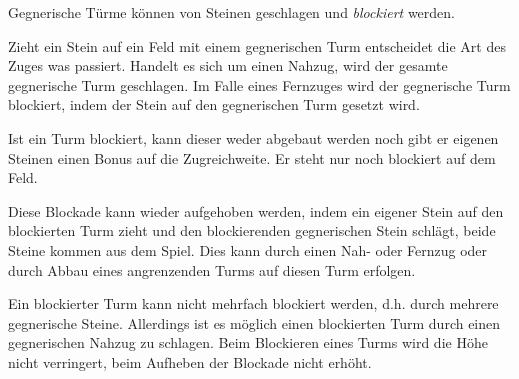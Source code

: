 

\newpage 
Gegnerische Türme können von Steinen geschlagen und \emph{blockiert} werden. 

Zieht ein Stein auf ein Feld mit einem gegnerischen Turm entscheidet die Art des Zuges was passiert. Handelt es sich um einen Nahzug, wird der gesamte gegnerische Turm geschlagen. Im Falle eines Fernzuges wird der gegnerische Turm blockiert, indem der Stein auf den gegnerischen Turm gesetzt wird.


Ist ein Turm blockiert, kann dieser weder abgebaut werden noch gibt er eigenen Steinen einen Bonus auf die Zugreichweite. Er steht nur noch blockiert auf dem Feld. 


Diese Blockade kann wieder aufgehoben werden, indem ein eigener Stein auf den blockierten Turm zieht und den blockierenden gegnerischen Stein schlägt, beide Steine kommen aus dem Spiel. Dies kann durch einen Nah- oder Fernzug oder durch Abbau eines angrenzenden Turms auf diesen Turm erfolgen.

Ein blockierter Turm kann nicht mehrfach blockiert werden, d.h. durch mehrere gegnerische Steine. Allerdings ist es möglich einen blockierten Turm durch einen gegnerischen Nahzug zu schlagen. Beim Blockieren eines Turms wird die Höhe nicht verringert, beim Aufheben der Blockade nicht erhöht.

\newpage

